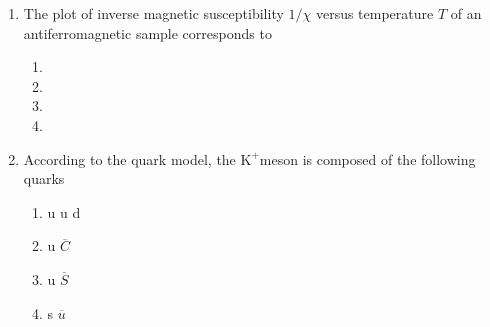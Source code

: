 \documentclass[journal,9pt,onecolumn]{IEEEtran}
\begin{document}
\begin{enumerate}
\item  The plot of inverse magnetic susceptibility $1 / \chi$ versus temperature $T$ of an antiferromagnetic sample corresponds to
\begin{multicols}{2}
\begin{enumerate}
    \item 
    \item 
    \item 
    \item 
    \end{enumerate}
\end{multicols}
\item   According to the quark model, the $\mathrm{K}^{+}$meson is composed of the following quarks
\begin{multicols}{4}
\begin{enumerate}
    \item u u d
    \item u $\overline{C}$
    \item u $\overline{S}$
    \item s $\overline{u}$
\end{enumerate}
\end{multicols}

\end{enumerate}
\end{document}
